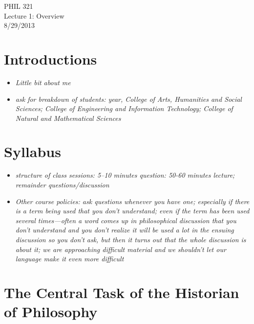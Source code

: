\documentclass[11pt]{article}
\begin{document}
\thispagestyle{empty}
\begin{center} \LARGE{PHIL 321\\ Lecture 1: Overview}\\ \vspace*{2mm}
\large{8/29/2013}\end{center}
\thispagestyle{empty}
\section*{Introductions}
\begin{itemize}\item{\emph{Little bit about me}}\item{\emph{ask for breakdown of students: year, College of Arts, Humanities and Social Sciences; College of Engineering and Information Technology; College of Natural and Mathematical Sciences}}\end{itemize}
\section*{Syllabus} 
\begin{itemize}
\item{\emph{structure of class sessions: 5--10 minutes question: 50-60 minutes lecture; remainder questions/discussion}}
\item{\emph{Other course policies: ask questions whenever you have one; especially if there is a term being used that you don't understand; even if the term has been used several times---often a word comes up in philosophical discussion that you don't understand and you don't realize it will be used a lot in the ensuing discussion so you don't ask, but then it turns out that the whole discussion is about it; we are approaching difficult material and we shouldn't let our language make it even more difficult}}\end{itemize}
\section*{The Central Task of the Historian of Philosophy}
\end{document}
